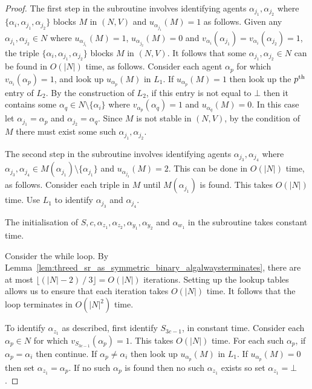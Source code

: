 \begin{proof}
The first step in the subroutine involves identifying agents $\alpha_{j_1}, \alpha_{j_2}$ where $\{ \alpha_i, \alpha_{j_1}, \alpha_{j_2}\}$ blocks $M$ in $(N, V)$ and $u_{\alpha_{j_1}}(M)=1$ as follows. Given any $\alpha_{j_1}, \alpha_{j_2}\in N$ where $u_{\alpha_{j_1}}(M)=1$, $u_{\alpha_{j_2}}(M)=0$ and $v_{\alpha_i}(\alpha_{j_1})=v_{\alpha_i}(\alpha_{j_2})=1$, the triple $\{ \alpha_i, \alpha_{j_1}, \alpha_{j_2}\}$ blocks $M$ in $(N, V)$. It follows that some $\alpha_{j_1}, \alpha_{j_2}\in N$ can be found in $O(|N|)$ time, as follows. Consider each agent $\alpha_{p}$ for which $v_{\alpha_i}(\alpha_{p})=1$, and look up $u_{\alpha_{p}}(M)$ in $L_1$. If $u_{\alpha_{p}}(M)=1$ then look up the ${p}\textsuperscript{th}$ entry of $L_2$. By the construction of $L_2$, if this entry is not equal to $\bot$ then it contains some $\alpha_{q}\in N\setminus \{ \alpha_i \}$ where $v_{\alpha_{p}}(\alpha_{q})=1$ and $u_{\alpha_{q}}(M)=0$. In this case let $\alpha_{j_1}=\alpha_{p}$ and $\alpha_{j_2}=\alpha_{q}$. Since $M$ is not stable in $(N, V)$, by the condition of $M$ there must exist some such $\alpha_{j_1}, \alpha_{j_2}$.

 The second step in the subroutine involves identifying agents $\alpha_{j_3}, \alpha_{j_4}$ where $\alpha_{j_3}, \alpha_{j_4} \in M(\alpha_{j_1}) \setminus \{ \alpha_{j_1} \}$ and $u_{\alpha_{j_3}}(M)=2$. This can be done in $O(|N|)$ time, as follows. Consider each triple in $M$ until $M(\alpha_{j_1})$ is found. This takes $O(|N|)$ time. Use $L_1$ to identify $\alpha_{j_3}$ and $\alpha_{j_4}$.
 
 The initialisation of $S, c, \alpha_{z_1}, \alpha_{z_2}, \alpha_{y_1}, \alpha_{y_2}$ and $\alpha_{w_1}$ in the subroutine takes constant time.
 
 Consider the while loop. By Lemma~\ref{lem:threed_sr_as_symmetric_binary_algalwaysterminates}, there are at most $\lfloor (|N|-2) \mathbin{/} 3 \rfloor = O(|N|)$ iterations. Setting up the lookup tables allows us to ensure that each iteration takes $O(|N|)$ time. It follows that the loop terminates in $O(|N|^2)$ time.
 
 To identify $\alpha_{z_1}$ as described, first identify $S_{3c-1}$, in constant time. Consider each $\alpha_{p}\in N$ for which $v_{S_{3c-1}}(\alpha_{p})=1$. This takes $O(|N|)$ time. For each such $\alpha_{p}$, if $\alpha_{p}=\alpha_i$ then continue. If $\alpha_{p}\neq \alpha_i$ then look up $u_{\alpha_{p}}(M)$ in $L_1$. If $u_{\alpha_{p}}(M)=0$ then set $\alpha_{z_1}=\alpha_{p}$. If no such $\alpha_{p}$ is found then no such $\alpha_{z_1}$ exists so set $\alpha_{z_1}=\bot$.
 

\end{proof}
